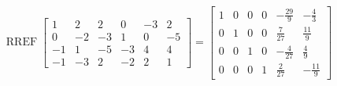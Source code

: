 \begin{exerciseAnswer} 


\[\operatorname{RREF} \left[\begin{array}{cccccc}
1 & 2 & 2 & 0 & -3 & 2 \\
0 & -2 & -3 & 1 & 0 & -5 \\
-1 & 1 & -5 & -3 & 4 & 4 \\
-1 & -3 & 2 & -2 & 2 & 1
\end{array}\right] = \left[\begin{array}{cccccc}
1 & 0 & 0 & 0 & -\frac{29}{9} & -\frac{4}{3} \\
0 & 1 & 0 & 0 & \frac{7}{27} & \frac{11}{9} \\
0 & 0 & 1 & 0 & -\frac{4}{27} & \frac{4}{9} \\
0 & 0 & 0 & 1 & \frac{2}{27} & -\frac{11}{9}
\end{array}\right] \]



\end{exerciseAnswer}
